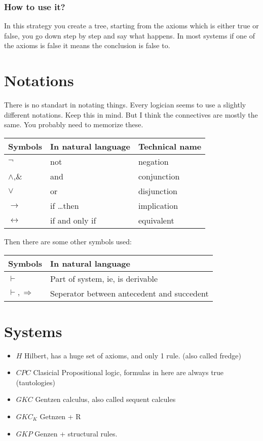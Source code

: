 \documentclass{article}
\begin{document}
\subsubsection{How to use it?}
In this strategy you create a tree, starting from the axioms which is either
true or false, you go down step by step and say what happens. In most systems
if one of the axioms is false it means the conclusion is false to.

\section{Notations}
\label{notations}
There is no standart in notating things. Every logician seems to use a
slightly different notations. Keep this in mind. But I think the connectives
are mostly the same. You probably need to memorize these.

\noindent
\begin{tabular}{@{}lll@{}}
Symbols&
In natural language &
Technical name \\ \toprule
$\neg$ 			& not 				& negation \\
$\wedge$,\& 	& and 				& conjunction \\
$\vee$ 			& or 				& disjunction\\
$\to$	& if \ldots then 	& implication\\
$\leftrightarrow$	& if and only if 	& equivalent\\ \bottomrule
\end{tabular}


Then there are some other symbols used:

\noindent
\begin{tabular}{@{}ll@{}}
Symbols&
In natural language \\ \toprule
$\vdash$ 					& Part of system, ie, is derivable \\
$\vdash, \Rightarrow$ 		& Seperator between antecedent and succedent\\ \bottomrule
\end{tabular}


\section{Systems}
\begin{itemize}
	\item $H$  Hilbert, has a huge set of axioms, and only 1 rule. (also called fredge)
	\item $CPC$ Clasicial Propositional logic, formulas in here are always true
(tautologies)
	\item $GKC$ Gentzen calculus, also called sequent calcules
	\item $GKC_K$  Getnzen + R 
	\item $GKP$ Genzen + structural rules.
\end{itemize}
\end{document}
